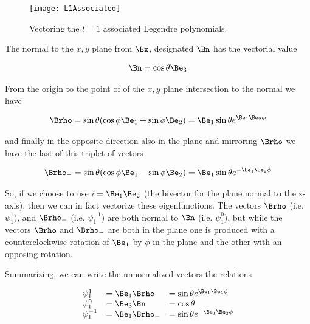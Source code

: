 \begin{figure}[htp]
\centering
\texttt{[image: L1Associated]}
\caption{Vectoring the $l=1$ associated Legendre polynomials.}\label{fig:L1Associated}
\end{figure}

The normal to the $x,y$ plane from $\Bx$, designated $\Bn$ has the vectorial value

\begin{align}\label{eqn:foo3}
\Bn = \cos\theta \Be_3 
\end{align}

From the origin to the point of of the $x,y$ plane intersection to the normal we have

\begin{align}\label{eqn:foo4}
\Brho = \sin\theta (\cos\phi \Be_1 + \sin\phi \Be_2) = \Be_1 \sin\theta e^{\Be_1 \Be_2 \phi}
\end{align}

and finally in the opposite direction also in the plane and mirroring $\Brho$ we have the last of this triplet of vectors

\begin{align}\label{eqn:foo5}
\Brho_{-} = \sin\theta (\cos\phi \Be_1 - \sin\phi \Be_2) = \Be_1 \sin\theta e^{-\Be_1 \Be_2 \phi}
\end{align}

So, if we choose to use $i=\Be_1 \Be_2$ (the bivector for the plane normal to the z-axis), then we can in fact vectorize these eigenfunctions.  The vectors $\Brho$ (i.e. $\psi_1^1)$, and $\Brho_{-}$ (i.e. $\psi_1^{-1}$) are both normal to $\Bn$ (i.e. $\psi_1^0$), but while the vectors $\Brho$ and $\Brho_{-}$ are both in the plane one is produced with a counterclockwise rotation of $\Be_1$ by $\phi$ in the plane and the other with an opposing rotation.

Summarizing, we can write the unnormalized vectors the relations

\begin{equation*}
\begin{array}{l l l}%
\psi_1^1 &= \Be_1 \Brho &= \sin\theta e^{\Be_1\Be_2 \phi} \\
\psi_1^0 &= \Be_3 \Bn &= \cos\theta \\
\psi_1^{-1} &= \Be_1 \Brho_{-} &= \sin\theta e^{-\Be_1\Be_2 \phi}
\end{array}
\end{equation*}


